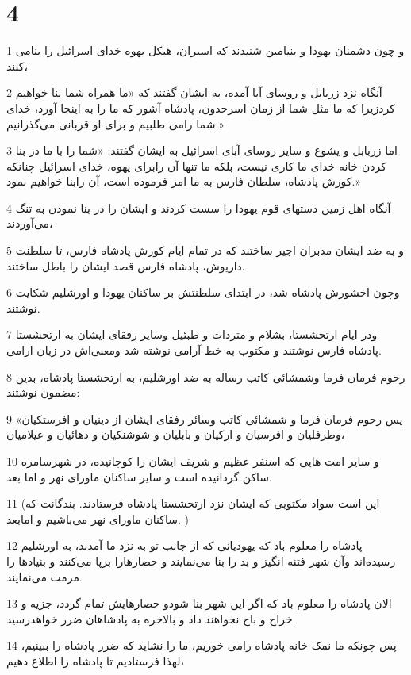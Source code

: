 \chapter{4}

\par 1 و چون دشمنان یهودا و بنیامین شنیدند که اسیران، هیکل یهوه خدای اسرائیل را بنامی کنند،
\par 2 آنگاه نزد زربابل و روسای آبا آمده، به ایشان گفتند که «ما همراه شما بنا خواهیم کردزیرا که ما مثل شما از زمان اسرحدون، پادشاه آشور که ما را به اینجا آورد، خدای شما رامی طلبیم و برای او قربانی می‌گذرانیم.»
\par 3 اما زربابل و یشوع و سایر روسای آبای اسرائیل به ایشان گفتند: «شما را با ما در بنا کردن خانه خدای ما کاری نیست، بلکه ما تنها آن رابرای یهوه، خدای اسرائیل چنانکه کورش پادشاه، سلطان فارس به ما امر فرموده است، آن رابنا خواهیم نمود.»
\par 4 آنگاه اهل زمین دستهای قوم یهودا را سست کردند و ایشان را در بنا نمودن به تنگ می‌آوردند،
\par 5 و به ضد ایشان مدبران اجیر ساختند که در تمام ایام کورش پادشاه فارس، تا سلطنت داریوش، پادشاه فارس قصد ایشان را باطل ساختند.
\par 6 وچون اخشورش پادشاه شد، در ابتدای سلطنتش بر ساکنان یهودا و اورشلیم شکایت نوشتند.
\par 7 ودر ایام ارتحشستا، بشلام و متردات و طبئیل وسایر رفقای ایشان به ارتحشستا پادشاه فارس نوشتند و مکتوب به خط آرامی نوشته شد ومعنی‌اش در زبان ارامی.
\par 8 رحوم فرمان فرما وشمشائی کاتب رساله به ضد اورشلیم، به ارتحشستا پادشاه، بدین مضمون نوشتند:
\par 9 «پس رحوم فرمان فرما و شمشائی کاتب وسائر رفقای ایشان از دینیان و افرستکیان وطرفلیان و افرسیان و ارکیان و بابلیان و شوشنکیان و دهائیان و عیلامیان،
\par 10 و سایر امت هایی که اسنفر عظیم و شریف ایشان را کوچانیده، در شهرسامره ساکن گردانیده است و سایر ساکنان ماورای نهر و اما بعد.
\par 11 (این است سواد مکتوبی که ایشان نزد ارتحشستا پادشاه فرستادند. بندگانت که ساکنان ماورای نهر می‌باشیم و امابعد. )
\par 12 پادشاه را معلوم باد که یهودیانی که از جانب تو به نزد ما آمدند، به اورشلیم رسیده‌اند وآن شهر فتنه انگیز و بد را بنا می‌نمایند و حصارهارا برپا می‌کنند و بنیادها را مرمت می‌نمایند. 
\par 13 الان پادشاه را معلوم باد که اگر این شهر بنا شودو حصارهایش تمام گردد، جزیه و خراج و باج نخواهند داد و بالاخره به پادشاهان ضرر خواهدرسید.
\par 14 پس چونکه ما نمک خانه پادشاه رامی خوریم، ما را نشاید که ضرر پادشاه را ببینیم، لهذا فرستادیم تا پادشاه را اطلاع دهیم،

